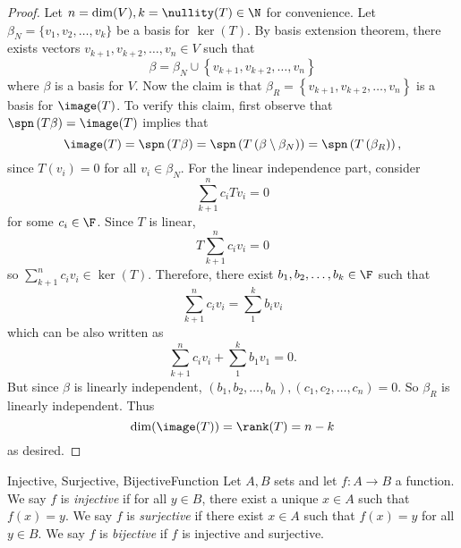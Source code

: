 \documentclass[linearalgebraI]{subfiles}
\begin{document}
    \begin{proof}
        Let $n=\dim(V), k=\nullity(T)\in\N$ for convenience. Let $\beta_N = \lbrace v_1, v_2, \ldots, v_k \rbrace$ be a basis for $\ker(T)$. By basis extension theorem, there exists vectors $v_{k+1}, v_{k+2}, \ldots, v_n\in V$ such that
        \begin{equation*}
            \beta = \beta_N \cup \left\lbrace v_{k+1}, v_{k+2}, \ldots, v_n \right\rbrace 
        \end{equation*}
        where $\beta$ is a basis for $V$. Now the claim is that $\beta_R = \left\lbrace v_{k+1}, v_{k+2}, \ldots, v_n \right\rbrace $ is a basis for $\image(T)$. To verify this claim, first observe that $\spn\left( T\beta \right)  = \image(T)$ implies that
        \begin{equation*}
            \image(T) = \spn\left( T\beta \right) = \spn\left( T\left( \beta\setminus\beta_N \right)  \right) = \spn\left( T\left( \beta_R \right)  \right) ,
        \end{equation*}
        since $T(v_i) = 0$ for all $v_i\in \beta_N$. For the linear independence part, consider
        \begin{equation*}
            \sum^n_{k+1} c_iTv_i = 0
        \end{equation*}
        for some $c_i\in \F$. Since $T$ is linear,
        \begin{equation*}
            T\sum^n_{k+1} c_iv_i = 0
        \end{equation*}
        so $\sum^n_{k+1} c_iv_i\in \ker(T)$. Therefore, there exist $b_1, b_2, \ldots, b_k\in \F$ such that
        \begin{equation*}
            \sum^n_{k+1} c_iv_i = \sum^k_1 b_iv_i
        \end{equation*}
        which can be also written as
        \begin{equation*}
            \sum^n_{k+1} c_iv_i + \sum^k_1 b_1v_1 = 0.
        \end{equation*}
        But since $\beta$ is linearly independent, $(b_1, b_2, \ldots, b_n), (c_1, c_2, \ldots, c_n) = 0$. So $\beta_R$ is linearly independent. Thus
        \begin{equation*}
            \dim (\image(T)) = \rank(T) = n-k
        \end{equation*}
        as desired.
    \end{proof}

    \begin{recall}{Injective, Surjective, Bijective}{Function}
        Let $A, B$ sets and let $f:A\to B$ a function. We say $f$ is \emph{injective} if for all $y\in B$, there exist a unique $x\in A$ such that $f(x)=y$. We say $f$ is \emph{surjective} if there exist $x\in A$ such that $f(x)=y$ for all $y\in B$. We say $f$ is \emph{bijective} if $f$ is injective and surjective.
    \end{recall}
\end{document}
